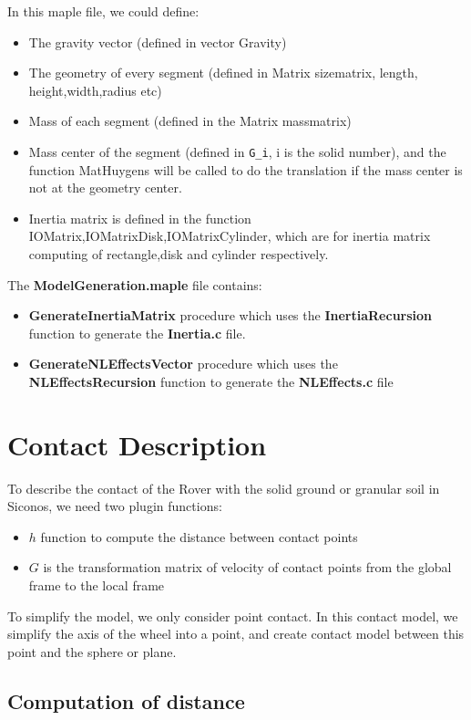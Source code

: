 In this maple file, we could define:

\begin{itemize}
\item The gravity vector (defined in vector Gravity)
\item The geometry of every segment (defined in Matrix sizematrix, length, height,width,radius etc)
\item Mass of each segment (defined in the Matrix massmatrix)
\item Mass center of the segment (defined in \verb|G_i|, i is the solid number), and the function MatHuygens will be called to do the translation if the mass center is not at the geometry center.
\item Inertia matrix is defined in the function IOMatrix,IOMatrixDisk,IOMatrixCylinder, which are for inertia matrix computing of rectangle,disk and cylinder respectively.
\end{itemize}

The \textbf{ModelGeneration.maple} file contains:

\begin{itemize}
\item \textbf{GenerateInertiaMatrix} procedure which uses the \textbf{InertiaRecursion} function to generate the \textbf{Inertia.c}
file.
\item \textbf{GenerateNLEffectsVector} procedure which uses the \textbf{NLEffectsRecursion} function to generate the
\textbf{NLEffects.c} file
\end {itemize}


\chapter{Contact Description}

To describe the contact of the Rover with the solid ground or granular soil in Siconos, we need two plugin functions:
\begin{itemize}
\item $h$ function to compute the distance between contact points
\item $G$ is the transformation matrix of velocity of contact points from the global frame to the local frame
\end{itemize}
To simplify the model, we only consider point contact. In this contact model, we simplify the axis of the wheel into a point, and create contact model between this point and the sphere or plane.
  

\section{Computation of distance}
